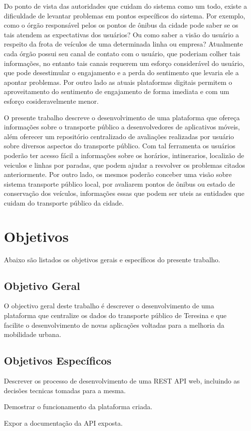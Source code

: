 Do ponto de vista das autoridades que cuidam do sistema como um todo, existe a dificuldade de levantar problemas em pontos específicos do sistema. Por exemplo, como o órgão responsável 
pelos os pontos de ônibus da cidade pode saber se os tais atendem as expectativas dos usuários? Ou como saber a visão do usuário a respeito da frota de veículos de uma determinada 
linha ou empresa? Atualmente cada órgão possui seu canal de contato com o usuário, que poderiam colher tais informações, no entanto tais canais requerem um esforço considerável do usuário, 
que pode desestimular o engajamento e a perda do sentimento que levaria ele a apontar problemas. Por outro lado as atuais plataformas digitais permitem o aproveitamento do sentimento de 
engajamento de forma imediata e com um esforço cosideravelmente menor. 

O presente trabalho descreve o desenvolvimento de uma plataforma que ofereça informações sobre o transporte público a desenvolvedores de aplicativos móveis, além oferecer um repositório 
centralizado de avaliações realizadas por usuário sobre diversos aspectos do transporte público. Com tal ferramenta os usuários poderão ter acesso fácil a informações sobre os
horários, intinerarios, localizão de veiculos e linhas por paradas,  que podem ajudar a resvolver os problemas citados anteriormente. Por outro lado, os mesmos poderão conceber uma 
visão sobre sistema transporte público local, por avaliarem pontos de ônibus ou estado de conservação dos veículos, informações essas que podem ser uteis as entidades que cuidam do 
transporte público da cidade.  

\section{Objetivos}

Abaixo são listados os objetivos gerais e específicos do presente trabalho.

\subsection{Objetivo Geral}

O objectivo geral deste trabalho é descrever o desenvolvimento de uma plataforma que centralize os dados do transporte público de Teresina e que facilite o desenvolvimento de novas aplicações 
voltadas para a melhoria da mobilidade urbana. 

\subsection{Objetivos Específicos}
\begin{lista}
  \item Descrever os processo de desenvolvimento de uma REST API web, incluindo as decisões tecnicas tomadas para a mesma. 
  \item Demostrar o funcionamento da plataforma criada.
  \item Expor a documentação da API exposta. 
\end{lista}